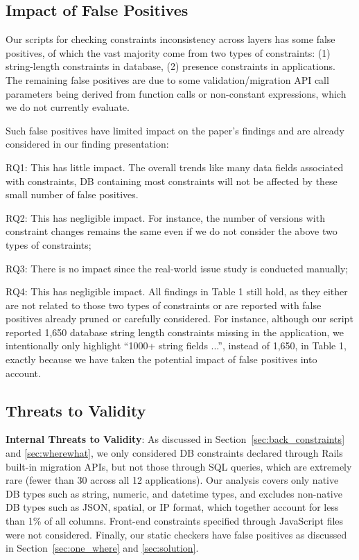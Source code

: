 \subsection{Impact of False Positives}
Our scripts for checking constraints inconsistency across layers has some false positives, of which  the vast majority come from two types of constraints: (1) string-length constraints in database, (2) presence constraints in applications. The remaining false positives are due to some validation/migration API call parameters being derived from function calls or non-constant expressions, which we do not currently evaluate. 

Such false positives have limited impact on the paper's findings and are already considered in our finding presentation:

RQ1: This has little impact. The overall trends like many data fields associated with constraints, DB containing most constraints will not be affected by these small number of false positives.

RQ2: This has negligible impact. For instance, the number of versions with constraint changes remains the same even if we do not consider the above two types of constraints;  

RQ3: There is no impact since the real-world issue study is conducted manually;

RQ4: This has negligible impact. All findings in Table 1 still hold, as they either are not related to those two types of constraints or are reported with false positives already pruned or carefully considered. For instance, although our script reported 1,650 database string length constraints missing in the application, we intentionally only highlight ``1000+ string fields ...'', instead of 1,650, in Table 1, exactly because we have taken the potential impact of false positives into account. 

\subsection{Threats to Validity}
 \textbf{Internal Threats to Validity}:
As discussed in 
Section~\ref{sec:back_constraints} and \ref{sec:wherewhat},
we only considered DB constraints declared through Rails built-in migration APIs, but not those through SQL queries, which are extremely rare (fewer than 30
across all 12 applications). 
Our analysis covers only native DB types such as string, numeric, and datetime types, and excludes non-native DB types such as JSON, spatial, or IP format, which together account for less than 1\% of all columns. Front-end constraints specified through JavaScript files were not considered. 
Finally, our static checkers have false positives as discussed in 
Section~\ref{sec:one_where} and \ref{sec:solution}.


